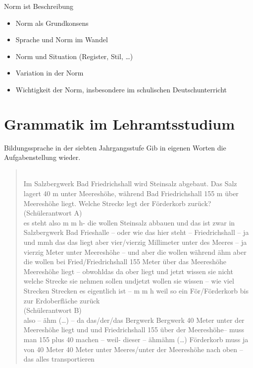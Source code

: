 \begin{frame}
  {Norm ist Beschreibung}
  \onslide<+->
  \begin{itemize}[<+->]
    \item Norm als Grundkonsens
    \item Sprache und Norm im Wandel
    \item Norm und Situation (Register, Stil, \dots)
    \item Variation in der Norm
      \Zeile
    \item \alert{Wichtigkeit der Norm, insbesondere im schulischen Deutschunterricht}
  \end{itemize}
\end{frame}


\section{Grammatik im Lehramtsstudium}

\begin{frame}
  {Bildungssprache in der siebten Jahrgangsstufe}
  \onslide<+->
  \onslide<+->
  \alert{Gib in eigenen Worten die Aufgabenstellung wieder.} \\
  \Halbzeile
  \onslide<+->
  \begin{quote}\footnotesize
    \\
    Im Salzbergwerk Bad Friedrichshall wird Steinsalz abgebaut. Das Salz lagert 40 m unter Meereshöhe, während Bad Friedrichshall 155 m über Meereshöhe liegt. Welche Strecke legt der Förderkorb zurück? \\
    \Halbzeile
    \onslide<+->
    \alert{(Schülerantwort A)}\\
    es steht also m m h- die wollen Steinsalz abbauen und das ist zwar in Salzbergwerk Bad Frieshalle -- oder wie das hier steht -- Friedrichshall -- ja und mmh das das liegt aber vier\slash vierzig Millimeter unter des Meeres -- ja vierzig Meter unter Meereshöhe -- und aber die wollen während ähm aber die wollen bei Fried\slash Friedrichshall 155 Meter über das Meereshöhe Meereshöhe liegt -- obwohldas da ober liegt und jetzt wissen sie nicht welche Strecke sie nehmen sollen undjetzt wollen sie wissen -- wie viel Strecken Strecken es eigentlich ist -- m m h weil so ein För\slash Förderkorb bis zur Erdoberfläche zurück\\
    \Halbzeile
    \onslide<+->
    \alert{(Schülerantwort B)}\\
    also -- ähm (\ldots) -- da das\slash der\slash das Bergwerk Bergwerk 40 Meter unter der Meereshöhe liegt und und Friedrichshall 155 über der Meereshöhe--  muss man 155 plus 40 machen -- weil- dieser -- ähmähm (\ldots) Förderkorb muss ja von 40 Meter 40 Meter unter Meeres\slash unter der Meereshöhe nach oben -- das alles transportieren
  \end{quote}
\end{frame}

